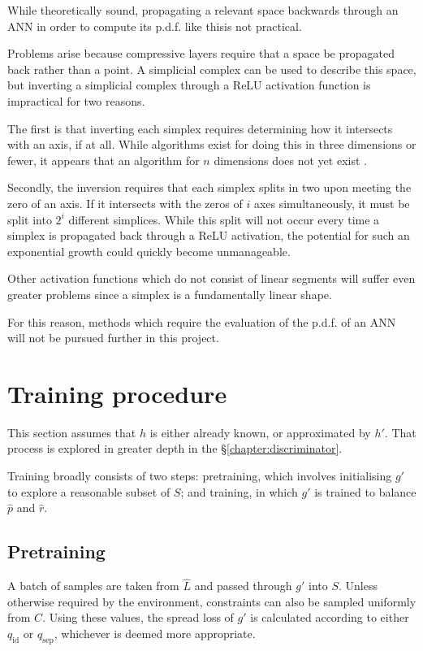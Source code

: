 \documentclass[../../main.tex]{subfiles}
\begin{document}
While theoretically sound, propagating a relevant space backwards through an ANN in order to compute its p.d.f. like thisis not practical.

Problems arise because compressive layers require that a space be propagated back rather than a point.
A simplicial complex can be used to describe this space, but inverting a simplicial complex through a ReLU activation function is impractical for two reasons.

The first is that inverting each simplex requires determining how it intersects with an axis, if at all.
While algorithms exist for doing this in three dimensions or fewer, it appears that an algorithm for $n$ dimensions does not yet exist \cite{wildberger12}.

Secondly, the inversion requires that each simplex splits in two upon meeting the zero of an axis.
If it intersects with the zeros of $i$ axes simultaneously, it must be split into $2^i$ different simplices.
While this split will not occur every time a simplex is propagated back through a ReLU activation, the potential for such an exponential growth could quickly become unmanageable.

Other activation functions which do not consist of linear segments will suffer even greater problems since a simplex is a fundamentally linear shape.

For this reason, methods which require the evaluation of the p.d.f. of an ANN will not be pursued further in this project.

\section{Training procedure} \label{section:generatorTrainingProcedure}

This section assumes that $h$ is either already known, or approximated by $h'$.
That process is explored in greater depth in the \S\ref{chapter:discriminator}.

Training broadly consists of two steps: pretraining, which involves initialising $g'$ to explore a reasonable subset of $S$; and training, in which $g'$ is trained to balance $\hat{p}$ and $\hat{r}$.

\subsection{Pretraining} \label{subsection:pretraining}

A batch of samples are taken from $\hat{L}$ and passed through $g'$ into $S$.
Unless otherwise required by the environment, constraints can also be sampled uniformly from $C$.
Using these values, the spread loss of $g'$ is calculated according to either $q_\text{id}$ or $q_\text{sep}$, whichever is deemed more appropriate.
\end{document}
